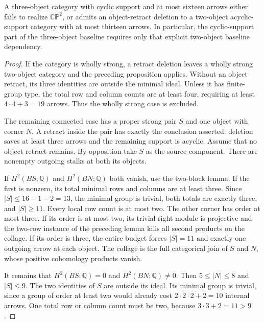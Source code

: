 \begin{proposition}
\label{CP2:A-baseline-strong-three}
A three-object category with cyclic support and at most
sixteen arrows either fails to realize $\mathbb{CP}^2$,
or admits an object-retract deletion to a two-object
acyclic-support category with at most thirteen arrows.
In particular, the cyclic-support part of the
three-object baseline requires only that explicit
two-object baseline dependency.
\end{proposition}
\begin{proof}
If the category is wholly strong, a retract deletion
leaves a wholly strong two-object category and the
preceding proposition applies.  Without an object
retract, its three identities are outside the minimal
ideal.  Unless it has finite-group type, the total
row and column counts are at least four, requiring
at least $4\cdot4+3=19$ arrows.  Thus the wholly
strong case is excluded.

The remaining connected case has a proper strong pair
$S$ and one object with corner $N$.  A retract inside
the pair has exactly the conclusion asserted: deletion
saves at least three arrows and the remaining support
is acyclic.  Assume that no object retract remains.
By opposition take $S$ as the source component.  There
are nonempty outgoing stalks at both its objects.

If $H^2(BS;\mathbb Q)$ and $H^2(BN;\mathbb Q)$ both
vanish, use the two-block lemma.  If the first is
nonzero, its total minimal rows and columns are at
least three.  Since $|S|\leq16-1-2=13$, the minimal
group is trivial, both totals are exactly three,
and $|S|\geq11$.  Every local row count is at most
two.  The other corner has order at most three.
If its order is at most two, its trivial right module
is projective and the two-row instance of the preceding
lemma kills all second products on the collage.  If
its order is three, the entire budget forces
$|S|=11$ and exactly one outgoing arrow at each object.
The collage is the full categorical join of $S$ and
$N$, whose positive cohomology products vanish.

It remains that $H^2(BS;\mathbb Q)=0$ and
$H^2(BN;\mathbb Q)\ne0$.  Then $5\leq|N|\leq8$
and $|S|\leq9$.  The two identities of $S$ are
outside its ideal.  Its minimal group is trivial,
since a group of order at least two would already
cost $2\cdot2\cdot2+2=10$ internal arrows.  One
total row or column count must be two, because
$3\cdot3+2=11>9$.


\end{proof}
